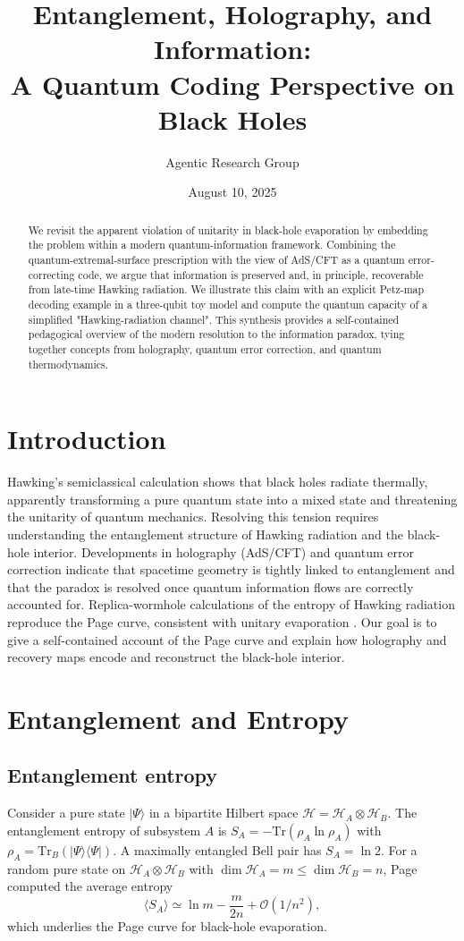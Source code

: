 \documentclass[12pt, numbers, sort&compress]{article}
\title{Entanglement, Holography, and Information: \\ A Quantum Coding Perspective on Black Holes}
\author{Agentic Research Group}
\date{August 10, 2025}
\begin{document}
\maketitle

\begin{abstract}
We revisit the apparent violation of unitarity in black-hole evaporation by embedding the problem within a modern quantum-information framework. Combining the quantum-extremal-surface prescription with the view of AdS/CFT as a quantum error-correcting code, we argue that information is preserved and, in principle, recoverable from late-time Hawking radiation. We illustrate this claim with an explicit Petz-map decoding example in a three-qubit toy model and compute the quantum capacity of a simplified "Hawking-radiation channel". This synthesis provides a self-contained pedagogical overview of the modern resolution to the information paradox, tying together concepts from holography, quantum error correction, and quantum thermodynamics.
\end{abstract}

\section{Introduction}
Hawking’s semiclassical calculation shows that black holes radiate thermally, apparently transforming a pure quantum state into a mixed state and threatening the unitarity of quantum mechanics. Resolving this tension requires understanding the entanglement structure of Hawking radiation and the black-hole interior. Developments in holography (AdS/CFT) and quantum error correction indicate that spacetime geometry is tightly linked to entanglement and that the paradox is resolved once quantum information flows are correctly accounted for. Replica-wormhole calculations of the entropy of Hawking radiation reproduce the Page curve, consistent with unitary evaporation \cite{SciPost:2020islands,Penington:2023replica}. Our goal is to give a self-contained account of the Page curve and explain how holography and recovery maps encode and reconstruct the black-hole interior.

\section{Entanglement and Entropy}

\subsection{Entanglement entropy}
Consider a pure state $|\Psi\rangle$ in a bipartite Hilbert space $\mathcal{H} = \mathcal{H}_A \otimes \mathcal{H}_B$. The entanglement entropy of subsystem $A$ is $S_A = -\mathrm{Tr}(\rho_A \ln \rho_A)$ with $\rho_A=\mathrm{Tr}_B(|\Psi\rangle\langle\Psi|)$. A maximally entangled Bell pair has $S_A=\ln 2$. For a random pure state on $\mathcal{H}_A\otimes\mathcal{H}_B$ with $\dim\mathcal{H}_A=m\le \dim\mathcal{H}_B=n$, Page computed the average entropy \cite{Page:1993prl}
\begin{equation}
\langle S_A \rangle \simeq \ln m - \frac{m}{2n} + \mathcal{O}(1/n^2),
\end{equation}
which underlies the Page curve for black-hole evaporation.
\end{document}
